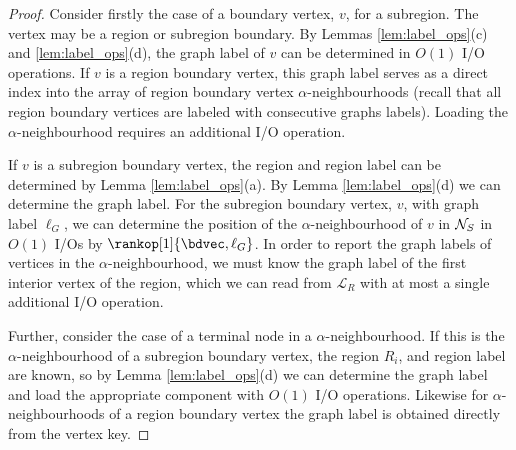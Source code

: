 \begin{proof}
Consider firstly the case of a boundary vertex, $v$, for a subregion.
The vertex may be a region or subregion boundary.
By Lemmas \ref{lem:label_ops}(c) and \ref{lem:label_ops}(d), the graph
label of $v$ can be determined in $O(1)$ I/O operations.
If $v$ is a region boundary vertex, this graph label serves as a direct 
index into the array of region boundary vertex $\alpha$-neighbourhoods 
(recall that all region boundary vertices are labeled with consecutive 
graphs labels).
Loading the $\alpha$-neighbourhood requires an additional I/O operation.

If $v$ is a subregion boundary vertex, the region and region
label can be determined by Lemma \ref{lem:label_ops}(a). 
By Lemma \ref{lem:label_ops}(d) we can determine the graph label. 
For the subregion boundary vertex, $v$, with graph label $\ell_G$, we can
determine the position of the $\alpha$-neighbourhood of $v$ in
$\mathcal{N}_S$ in $O(1)$ I/Os by $\rankop[1]{\bdvec, \ell_G}$.
In order to report the graph labels of vertices in the
  $\alpha$-neighbourhood, we must know the graph label of the first
  interior vertex of the region, which we can read from
  $\mathcal{L}_R$ with at most a single additional I/O operation.

  Further, consider the case of a terminal node in a
  $\alpha$-neighbourhood. If this is the $\alpha$-neighbourhood of a
  subregion boundary vertex, the region $R_i$, and region label are
  known, so by Lemma \ref{lem:label_ops}(d) we can determine the graph
  label and load the appropriate component with $O(1)$ I/O
  operations. 
  Likewise for $\alpha$-neighbourhoods of a region
  boundary vertex the graph label is obtained directly from the vertex
  key.


\end{proof}
